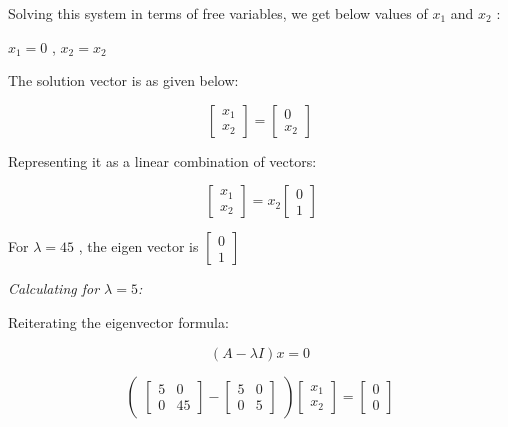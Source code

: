 \documentclass[a4paper]{report}
\begin{document}
\vspace{5mm}

Solving this system in terms of free variables, we get below values of $x_1$ and $x_2$ :

$x_1=0$ ,
$x_2=x_2$

The solution vector is as given below:

\[\begin{bmatrix}
    x_1\\x_2
\end{bmatrix}=\begin{bmatrix}
    0\\x_2
\end{bmatrix}\]

\vspace{5mm}

Representing it as a linear combination of vectors:

\[\ \begin{bmatrix}
    x_1\\x_2
\end{bmatrix}=x_2\begin{bmatrix}
    0\\1
\end{bmatrix}\]

For $\lambda = 45$ , the eigen vector is $\left [\begin{array}{c}
     0  \\
     1 
\end{array}\right]$

\vspace{8mm}

\textit{Calculating for $\lambda = 5$:}

Reiterating the eigenvector formula:

\begin{equation*}
    (A-\lambda I)x=0 
\end{equation*}

\[\begin{pmatrix}\begin{bmatrix}
    5&0\\0&45
\end{bmatrix}- \begin{bmatrix}
    5&0\\0&5
\end{bmatrix} \end{pmatrix} \begin{bmatrix}
    x_1\\x_2
\end{bmatrix}=\begin{bmatrix}
    0\\0
\end{bmatrix}\]
\end{document}
